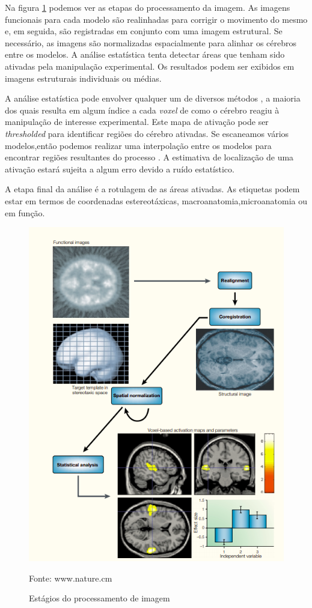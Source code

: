 \documentclass[openright]{UFRGS} %
\begin{document}
Na figura \ref{fig:normalizationmri} podemos ver as etapas do processamento da imagem. As imagens funcionais para cada modelo são realinhadas para corrigir o movimento do mesmo e, em seguida, são registradas em conjunto com uma imagem estrutural. Se necessário, as imagens são normalizadas espacialmente para alinhar os cérebros entre os modelos. A análise estatística tenta detectar áreas que tenham sido ativadas pela manipulação experimental. Os resultados podem ser exibidos em imagens estruturais individuais ou médias.

A análise estatística pode envolver qualquer um de diversos métodos , a maioria dos quais resulta em algum índice a cada \textit{voxel} de como o cérebro reagiu à manipulação de interesse experimental. Este mapa de ativação pode ser \textit{thresholded} para identificar regiões do cérebro ativadas. Se escaneamos vários modelos,então podemos realizar uma interpolação entre os modelos para
encontrar regiões resultantes do processo  \cite{brett2002problem}. A estimativa de localização de uma ativação estará sujeita a algum erro devido a ruído estatístico.

A etapa final da análise é a rotulagem de as áreas ativadas. As etiquetas podem estar em termos de coordenadas estereotáxicas, macroanatomia,microanatomia ou  em função.

\begin{figure}[h]
    \centering
    \caption{Estágios do processamento de imagem}
    \includegraphics[scale=0.40]{normalization_mri.png}
    \centerline{Fonte: www.nature.cm}
    \label{fig:normalizationmri}
\end{figure}
\end{document}
